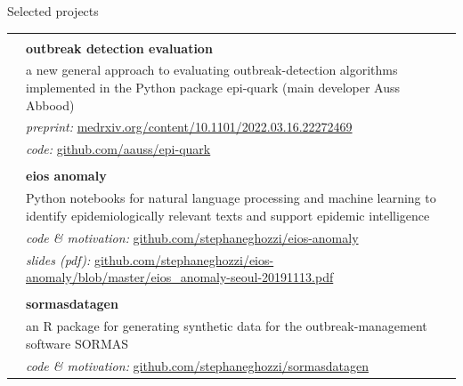 \documentclass[a4paper,11pt,oneside]{article}
\begin{document}
\noindent \begin{Large}Selected projects\end{Large}
\noindent \begin{longtable}{@{}p{3.1cm}@{}@{}p{13.9cm}@{}}
   & \\
   & \textbf{outbreak detection evaluation} \\
   & a new general approach to evaluating outbreak-detection algorithms implemented in the Python package epi-quark (main developer Auss Abbood) \\
   & \emph{preprint:} \href{https://www.medrxiv.org/content/10.1101/2022.03.16.22272469}{medrxiv.org/content/10.1101/2022.03.16.22272469}\\
   & \emph{code:} \href{https://github.com/aauss/epi-quark}{github.com/aauss/epi-quark}\\
   & \\
   & \textbf{eios anomaly} \\
   & Python notebooks for natural language processing and machine learning to identify epidemiologically relevant texts and support epidemic intelligence \\
   & \emph{code \& motivation:} \href{https://github.com/stephaneghozzi/eios-anomaly}{github.com/stephaneghozzi/eios-anomaly} \\
   & \emph{slides (pdf):} \href{https://github.com/stephaneghozzi/eios-anomaly/blob/master/eios\_anomaly-seoul-20191113.pdf}{github.com/stephaneghozzi/eios-anomaly/blob/master/eios\_anomaly-seoul-20191113.pdf} \\
   & \\
   & \textbf{sormasdatagen} \\ 
   & an R package for generating synthetic data for the outbreak-management software SORMAS \\
   & \emph{code \& motivation:} \href{https://github.com/stephaneghozzi/sormasdatagen}{github.com/stephaneghozzi/sormasdatagen} \\
\end{longtable}
\end{document}
